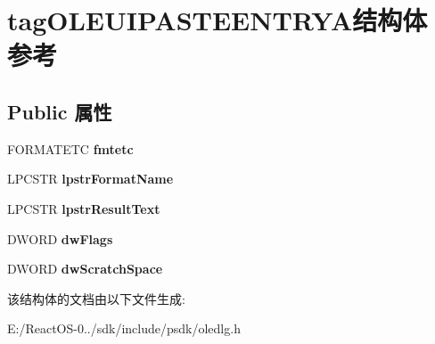 \hypertarget{structtag_o_l_e_u_i_p_a_s_t_e_e_n_t_r_y_a}{}\section{tag\+O\+L\+E\+U\+I\+P\+A\+S\+T\+E\+E\+N\+T\+R\+Y\+A结构体 参考}
\label{structtag_o_l_e_u_i_p_a_s_t_e_e_n_t_r_y_a}
\subsection*{Public 属性}
\begin{DoxyCompactItemize}
\item 
\mbox{\label{structtag_o_l_e_u_i_p_a_s_t_e_e_n_t_r_y_a_a63e662eaf627cf1fa66bebb79aaa1b43}} 
F\+O\+R\+M\+A\+T\+E\+TC {\bfseries fmtetc}
\item 
\mbox{\label{structtag_o_l_e_u_i_p_a_s_t_e_e_n_t_r_y_a_af6989d9d2a08ff1b2c3c8c3f93583a1b}} 
L\+P\+C\+S\+TR {\bfseries lpstr\+Format\+Name}
\item 
\mbox{\label{structtag_o_l_e_u_i_p_a_s_t_e_e_n_t_r_y_a_a5fb4bd90466026f2de5a78aa632bf325}} 
L\+P\+C\+S\+TR {\bfseries lpstr\+Result\+Text}
\item 
\mbox{\label{structtag_o_l_e_u_i_p_a_s_t_e_e_n_t_r_y_a_a4e45dc289908cce5883226e9f3a6739d}} 
D\+W\+O\+RD {\bfseries dw\+Flags}
\item 
\mbox{\label{structtag_o_l_e_u_i_p_a_s_t_e_e_n_t_r_y_a_ab9979edc805906dd5db662e0195f30f2}} 
D\+W\+O\+RD {\bfseries dw\+Scratch\+Space}
\end{DoxyCompactItemize}


该结构体的文档由以下文件生成\+:\begin{DoxyCompactItemize}
\item 
E\+:/\+React\+O\+S-\/0../sdk/include/psdk/oledlg.\+h\end{DoxyCompactItemize}

